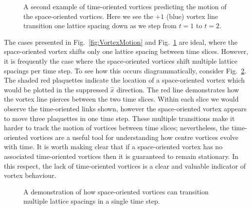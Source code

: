 \begin{figure}[H]
\begin{subfigure}[b]{0.45\textwidth}
\end{subfigure}
\caption[A second example of time-oriented vortices predicting the motion of the space-oriented vortices.]{\label{fig:VortexLineMotion}A second example of time-oriented vortices predicting the motion of the space-oriented vortices. Here we see the $+1$ (blue) vortex line transition one lattice spacing down as we step from $t=1$ to $t=2$.}
\end{figure}
%

The cases presented in Fig.~\ref{fig:VortexMotion} and Fig.~\ref{fig:VortexLineMotion} are ideal, where the space-oriented vortex shifts only one lattice spacing between time slices. However, it is frequently the case where the space-oriented vortices shift multiple lattice spacings per time step. To see how this occurs diagrammatically, consider Fig.~\ref{fig:ComplexStructure}. The shaded red plaquettes indicate the location of a space-oriented vortex which would be plotted in the suppressed $\hat{x}$ direction. The red line demonstrates how the vortex line pierces between the two time slices. Within each slice we would observe the time-oriented links shown, however the space-oriented vortex appears to move three plaquettes in one time step. These multiple transitions make it harder to track the motion of vortices between time slices; nevertheless, the time-oriented vortices are a useful tool for understanding how centre vortices evolve with time. It is worth making clear that if a space-oriented vortex has no associated time-oriented vortices then it is guaranteed to remain stationary. In this respect, the lack of time-oriented vortices is a clear and valuable indicator of vortex behaviour.
%
\begin{figure}
\centering

\caption{\label{fig:ComplexStructure}A demonstration of how space-oriented vortices can transition multiple lattice spacings in a single time step.}
\end{figure}

